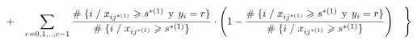 \documentclass[
  11pt,
  a4paper,
]{article}
\begin{document}
\begin{gather*}
 +  \hspace{0.3cm}         \sum_{r=0,1,..,c-1}^{}  \dfrac{\# \hspace{0.1 cm}\lbrace i \hspace{0.1 cm}/\hspace{0.1 cm} x_{ij^{*(1)}} \geqslant s^{*(1)} \hspace{0.15 cm}\text{y}\hspace{0.15 cm} y_i = r \rbrace}{\# \hspace{0.1 cm}\lbrace i \hspace{0.1 cm}/\hspace{0.1 cm} x_{ij^{*(1)}} \geqslant s^{*(1)} \rbrace}  \cdot \left(   1 - \dfrac{\# \hspace{0.1 cm}\lbrace i \hspace{0.1 cm}/\hspace{0.1 cm} x_{ij^{*(1)}} \geqslant s^{*(1)} \hspace{0.15 cm}\text{y}\hspace{0.15 cm} y_i = r \rbrace}{\# \hspace{0.1 cm}\lbrace i \hspace{0.1 cm}/\hspace{0.1 cm} x_{ij^{*(1)}} \geqslant s^{*(1)} \rbrace}  \right)      \hspace{0.3cm}       \Biggl\}  
\end{gather*}
\end{document}
